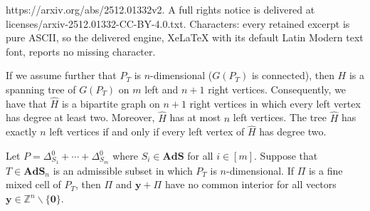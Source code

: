 \documentclass[10pt,a4paper]{amsart}
\newcommand{\Z}{\mathbb Z}
\newcommand{\ads}{\mathbf{AdS}}
\newcommand{\bby}{\mathbf{y}}
\begin{document}
https://arxiv.org/abs/2512.01332v2. A full rights notice is delivered at licenses/arxiv-2512.01332-CC-BY-4.0.txt. Characters: every retained excerpt is pure ASCII, so the delivered engine, XeLaTeX with its default Latin Modern text font, reports no missing character.
\begin{rem}\label{rem: at-most-n-left-vertices}
    If we assume further that $P_T$ is $n$-dimensional ($G(P_T)$ is connected), then $H$ is a spanning tree of $G(P_T)$ on $m$ left and $n+1$ right vertices. Consequently, we have that $\hat{H}$ is a bipartite graph on $n+1$ right vertices in which every left vertex has degree at least two. Moreover, $\hat{H}$ has at most $n$ left vertices. The tree $\hat{H}$ has exactly $n$ left vertices if and only if every left vertex of $\hat{H}$ has degree two.
\end{rem} 

\begin{lem}\label{lem: no-common-interior} Let $P = \Delta^0_{S_1} + \cdots + \Delta^0_{S_m}$ where $S_i \in \ads$ for all $i \in [m]$. Suppose that $T \in \ads_n$ is an admissible subset in which $P_T$ is $n$-dimensional. If $\Pi$ is a fine mixed cell of $P_T$, then $\Pi$ and $\bby + \Pi$ have no common interior for all vectors $\bby \in \Z^n\backslash\{\mathbf{0}\}.$
\end{lem} 
\end{document}
